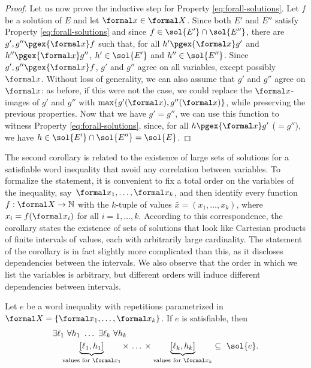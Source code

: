 \documentclass{article}
\begin{document}
\begin{proof}
Let us now prove the inductive step for Property \eqref{eq:forall-solutions}.
Let $f$ be a solution of $E$ and let $\formal x\in\formal X$.
Since both $E'$ and $E''$ satisfy Property \eqref{eq:forall-solutions} 
and since $f\in\sol{E'} \cap \sol{E''}$, there are 
$g',g'' \pgex{\formal x} f$ such that, 
for all $h' \pgex{\formal x} g'$ and $h'' \pgex{\formal x} g''$,
$h'\in\sol{E'}$ and $h''\in\sol{E''}$.
Since $g',g'' \pgex{\formal x} f$, 
$g'$ and $g''$ agree on all variables, except possibly $\formal x$.
Without loss of generality, we can also assume that $g'$ and $g''$ 
agree on $\formal x$: as before, if this were not the case, 
we could replace the $\formal x$-images of $g'$ and $g''$ with 
$\max\{g'(\formal x),g''(\formal x)\}$, while preserving the previous properties. 
Now that we have $g'=g''$, we can use this function to witness
Property \eqref{eq:forall-solutions}, since, for all $h \pgex{\formal x} g'$ ($ = g''$),
we have $h\in \sol{E'} \cap \sol{E''} = \sol{E}$.
\end{proof}



The second corollary is related to the existence of large sets of 
solutions for a satisfiable word inequality that avoid any 
correlation between variables. 
To formalize the statement, it is convenient to fix a total order 
on the variables of the inequality, 
say~$\formal x_1,\dots,\formal x_k$,
and then identify every function $f:\formal X\rightarrow\mathbb{N}$ 
with the $k$-tuple of values $\bar x = (x_1,\dots,x_k)$, where 
$x_i = f(\formal x_i)$ for all $i=1,\dots,k$.
According to this correspondence, the corollary states the existence 
of sets of solutions that look like Cartesian products of finite
intervals of values, each with arbitrarily large cardinality.
The statement of the corollary is in fact slightly more complicated 
than this, as it discloses dependencies between the intervals.
We also observe that the order in which we list the variables 
is arbitrary, but different orders will induce different 
dependencies between intervals.


\begin{corollary}\label{cor:saarela2}
Let $e$ be a word inequality with repetitions parametrized in 
$\formal X = \{\formal x_1,\dots,\formal x_k\}$.
If $e$ is satisfiable, then 
\begin{align*}
  & \exists \ell_1 ~ \forall h_1 ~ \dots ~ \exists \ell_k ~ \forall h_k \\
  & \quad
  \underbrace{[\ell_1,h_1]}_{\text{values for }\formal x_1}
  \times \, \dots \, \times
  \underbrace{[\ell_k,h_k]}_{\text{values for }\formal x_k} 
  \subseteq~ \sol{e}.
\end{align*}
\end{corollary}
\end{document}
